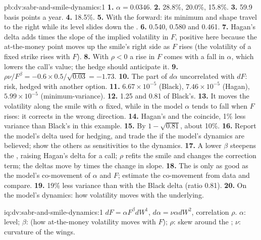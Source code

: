 \begin{solution}{pb:dv:sabr-and-smile-dynamics:1}
\textbf{1.} $\alpha=0.0346$.
\textbf{2.} 28.8\%, 20.0\%, 15.8\%.
\textbf{3.} 59.9 basis points a year.
\textbf{4.} 18.5\%.
\textbf{5.} With the forward: its minimum and shape travel to the right while its level slides down the .
\textbf{6.} 0.540, 0.580 and 0.461.
\textbf{7.} Hagan's delta adds  times the slope of the implied volatility in $F$, positive here because the
at-the-money point moves up the smile's right side as $F$ rises (the volatility of a fixed strike rises with $F$).
\textbf{8.} With $\rho<0$ a rise in $F$ comes with a fall in $\alpha$, which lowers the call's value; the hedge should
anticipate it.
\textbf{9.} $\rho\nu/F^\beta=-0.6\times0.5/\sqrt{0.03}=-1.73$.
\textbf{10.} The part of $d\alpha$ uncorrelated with $dF$:  risk, hedged with another option.
\textbf{11.} $6.67\times10^{-5}$ (Black), $7.46\times10^{-5}$ (Hagan), $5.99\times10^{-5}$ (minimum-variance).
\textbf{12.} 1.25 and 0.81 of Black's.
\textbf{13.} It moves the volatility along the smile with $\alpha$ fixed, while in the model $\alpha$ tends to fall when
$F$ rises: it corrects in the wrong direction.
\textbf{14.} Hagan's and the  coincide, 1\% less variance than Black's in this example.
\textbf{15.} By $1-\sqrt{0.81}$, about 10\%.
\textbf{16.} Report the model's delta used for hedging, and trade the  if the model's dynamics are
believed; show the others as sensitivities to the dynamics.
\textbf{17.} A lower $\beta$ steepens the , raising Hagan's delta for a call; $\rho$ refits the smile and changes
the correction term; the deltas move by  times the change in slope.
\textbf{18.} The  is only as good as the model's co-movement of $\alpha$ and $F$; estimate the
co-movement from data and compare.
\textbf{19.} 19\% less variance than with the Black delta (ratio 0.81).
\textbf{20.} On the model's dynamics: how volatility moves with the underlying.
\end{solution}

\begin{solution}{iq:dv:sabr-and-smile-dynamics:1}
$dF=\alpha F^\beta dW^1$, $d\alpha=\nu\alpha dW^2$, correlation $\rho$. $\alpha$: level; $\beta$:  (how at-the-money
volatility moves with $F$); $\rho$: skew around the ; $\nu$: curvature of the wings.
\end{solution}


